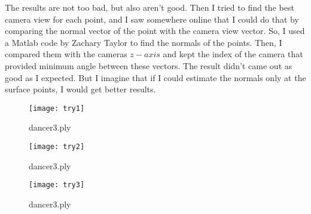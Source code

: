 \documentclass{article}
\begin{document}
The results are not too bad, but also aren't good. Then I tried to find the best camera view for each point, and I saw somewhere online that I could do that by comparing the normal vector of the point with the camera view vector. So, I used a Matlab code by Zachary Taylor to find the normals of the points. Then, I compared them with the cameras $z-axis$ and kept the index of the camera that provided minimum angle between these vectors. The result didn't came out as good as I expected. But I imagine that if I could estimate the normals only at the surface points, I would get better results.

\begin{figure}[H]
  \caption{dancer3.ply}
  \centering
    \texttt{[image: try1]}
\end{figure}

\begin{figure}[H]
  \caption{dancer3.ply}
  \centering
    \texttt{[image: try2]}
\end{figure}

\begin{figure}[H]
  \caption{dancer3.ply}
  \centering
    \texttt{[image: try3]}
\end{figure}
\end{document}
